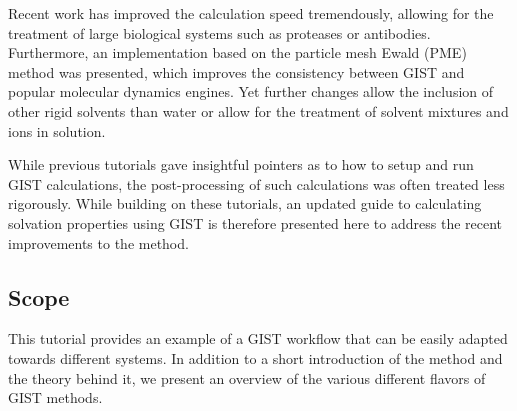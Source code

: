 \documentclass[9pt,tutorial]{livecoms}
\begin{document}
Recent work has improved the calculation speed tremendously, allowing for the treatment of large biological systems such as proteases or antibodies.
Furthermore, an implementation based on the particle mesh Ewald (PME) \cite{Darden1993-pme} method was presented, which improves the consistency between GIST and popular molecular dynamics engines. 
Yet further changes allow the inclusion of other rigid solvents than water or allow for the treatment of solvent mixtures and ions in solution. 

While previous tutorials gave insightful pointers as to how to setup and run GIST calculations, the post-processing of such calculations was often treated less rigorously. While building on these tutorials, an updated guide to calculating solvation properties using GIST is therefore presented here to address the recent improvements to the method.

%
%
%

\subsection{Scope}

This tutorial provides an example of a GIST workflow that can be easily adapted towards different systems. 
In addition to a short introduction of the method and the theory behind it, we present an overview of the various different flavors of GIST methods.
\end{document}

